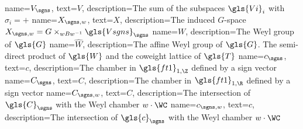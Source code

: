        {
       name={\ensuremath{V_\sgns}},
     text={\ensuremath{V}},
   description={The sum of the subspaces $\gls{Vi}_{i}$ with $\sigma_i=+$ }
 }
        {
       name={\ensuremath{X_{\sgns,w}}},
     text={\ensuremath{X}},
   description={The induced $G$-space $ X_{\sgns,w}=G\times_{wBw^{-1}}\gls{Vsgns}_{\sgns}$}
 }
      {
     name={\ensuremath{W}},
   description={The Weyl group of $\gls{G}$}
 }
       {
     name={\ensuremath{\widehat{W}}},
   description={The affine Weyl group of $\gls{G}$.  The semi-direct
     product of $\gls{W}$ and the coweight lattice of $\gls{T}$}
 }
   {
       name={\ensuremath{c_\sgns}},
     text={\ensuremath{c}},
   description={The chamber in $\gls{ft1}_{1,\Z}$ defined by a sign vector}
 }
  {
       name={\ensuremath{C_\sgns}},
     text={\ensuremath{C}},
   description={The chamber in $\gls{ft1}_{1,\R}$ defined by a sign vector}
 }
  {
       name={\ensuremath{C_{\sgns,w}}},
     text={\ensuremath{C}},
   description={The intersection of $\gls{C}_\sgns$ with the Weyl chamber $w\cdot \WC$}
 }
 {
       name={\ensuremath{c_{\sgns,w}}},
     text={\ensuremath{c}},
   description={The intersection of $\gls{c}_\sgns$ with the Weyl chamber $w\cdot \WC$}
 }
 
